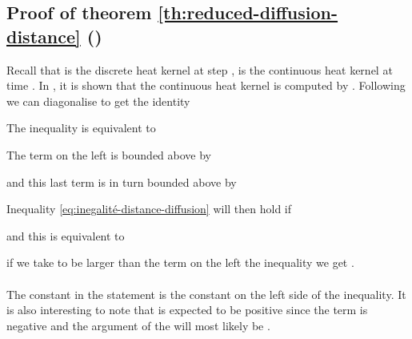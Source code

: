 \documentclass{article} \usepackage{arxiv,times}
\begin{document}
\subsection{Proof of theorem \ref{th:reduced-diffusion-distance} ()}
\label{app:proof:reduced-diffusion-distance}



Recall that  is the discrete heat kernel at step ,  is the continuous heat kernel at time .
In \cite{barlow_2017}, it is shown that the continuous heat kernel is computed by 
.
Following \cite{COIFMAN20065} we can diagonalise  to get the identity

The inequality  is equivalent to

The term on the left is bounded above by 

and this last term is in turn bounded above by

Inequality \ref{eq:inegalité-distance-diffusion} will then hold if

and this is equivalent to

if we take  to be larger than the term on the left the inequality we get .
\paragraph{}
The constant  in the statement is the constant on the left side of the inequality. It is also interesting to note that  is expected to be positive since the term  is negative and the argument of the  will most likely be .
\end{document}
